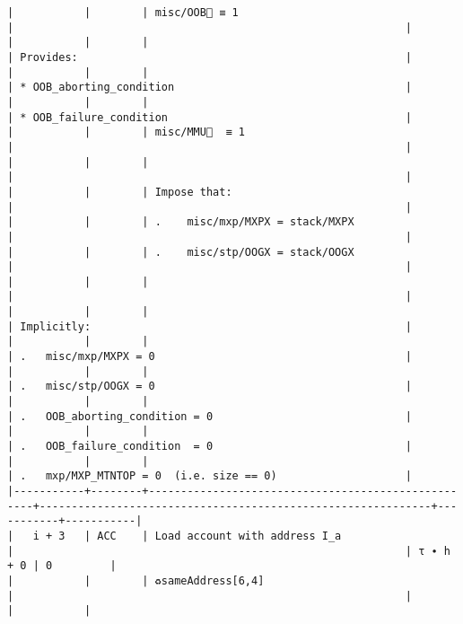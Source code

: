 \documentclass[varwidth=\maxdimen,margin=0.5cm,multi={verbatim}]{standalone}
\begin{document}
\begin{verbatim}
|           |        | misc/OOB🚩 ≡ 1                                     |                                                             |
|           |        |                                                    | Provides:                                                   |
|           |        |                                                    | * OOB_aborting_condition                                    |
|           |        |                                                    | * OOB_failure_condition                                     |
|           |        | misc/MMU🚩  ≡ 1                                    |                                                             |
|           |        |                                                    |                                                             |
|           |        | Impose that:                                       |                                                             |
|           |        | .    misc/mxp/MXPX = stack/MXPX                    |                                                             |
|           |        | .    misc/stp/OOGX = stack/OOGX                    |                                                             |
|           |        |                                                    |                                                             |
|           |        |                                                    | Implicitly:                                                 |
|           |        |                                                    | .   misc/mxp/MXPX = 0                                       |
|           |        |                                                    | .   misc/stp/OOGX = 0                                       |
|           |        |                                                    | .   OOB_aborting_condition = 0                              |
|           |        |                                                    | .   OOB_failure_condition  = 0                              |
|           |        |                                                    | .   mxp/MXP_MTNTOP = 0  (i.e. size == 0)                    |
|-----------+--------+----------------------------------------------------+-------------------------------------------------------------+-----------+-----------|
|   i + 3   | ACC    | Load account with address I_a                      |                                                             | τ ∙ h + 0 | 0         |
|           |        | ♻️sameAddress[6,4]                                  |                                                             |           |           |

\end{verbatim}
\end{document}
